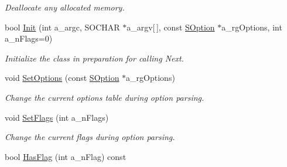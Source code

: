 \begin{DoxyCompactItemize}
\begin{DoxyCompactList}\small\item\em Deallocate any allocated memory. \end{DoxyCompactList}\item 
bool \hyperlink{class_c_simple_opt_templ_a295504063bf4b5cb259541581ee46bfc}{Init} (int a\-\_\-argc, S\-O\-C\-H\-A\-R $\ast$a\-\_\-argv\mbox{[}$\,$\mbox{]}, const \hyperlink{struct_c_simple_opt_templ_1_1_s_option}{S\-Option} $\ast$a\-\_\-rg\-Options, int a\-\_\-n\-Flags=0)
\begin{DoxyCompactList}\small\item\em Initialize the class in preparation for calling Next. \end{DoxyCompactList}\item 
void \hyperlink{class_c_simple_opt_templ_a8a1b62c4ae02b7f785f577d66740f2b7}{Set\-Options} (const \hyperlink{struct_c_simple_opt_templ_1_1_s_option}{S\-Option} $\ast$a\-\_\-rg\-Options)
\begin{DoxyCompactList}\small\item\em Change the current options table during option parsing. \end{DoxyCompactList}\item 
void \hyperlink{class_c_simple_opt_templ_ae64fd8b816b6d712e2406591df193d5b}{Set\-Flags} (int a\-\_\-n\-Flags)
\begin{DoxyCompactList}\small\item\em Change the current flags during option parsing. \end{DoxyCompactList}\item 
\hypertarget{class_c_simple_opt_templ_a6d64a2ee929aa5442191614cfdc7f53f}{bool \hyperlink{class_c_simple_opt_templ_a6d64a2ee929aa5442191614cfdc7f53f}{Has\-Flag} (int a\-\_\-n\-Flag) const }\label{class_c_simple_opt_templ_a6d64a2ee929aa5442191614cfdc7f53f}


\end{DoxyCompactItemize}
